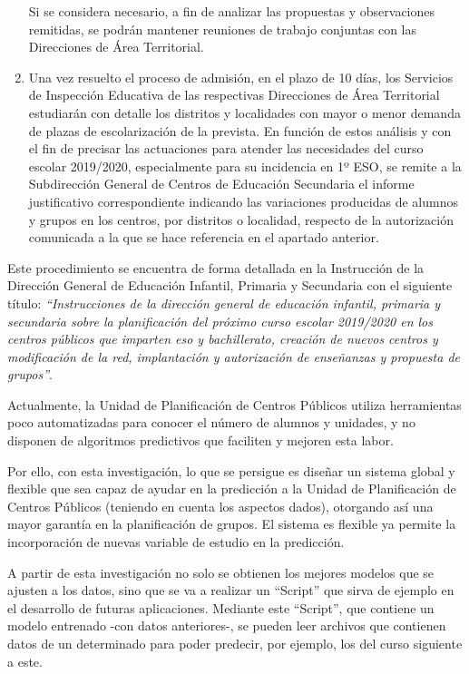 \begin{enumerate}
	Si se considera necesario, a fin de analizar las propuestas y observaciones remitidas, se podrán mantener reuniones de trabajo conjuntas con las Direcciones de Área Territorial.
	
	\item Una vez resuelto el proceso de admisión, en el plazo de 10 días, los Servicios de Inspección Educativa de las respectivas Direcciones de Área Territorial estudiarán con detalle los distritos y localidades con mayor o menor demanda de plazas de escolarización de la prevista. En función de estos análisis y con el fin de precisar las actuaciones para atender las necesidades del curso escolar 2019/2020, especialmente para su incidencia en 1º ESO, se remite a la Subdirección General de Centros de Educación Secundaria el informe justificativo correspondiente indicando las variaciones producidas de alumnos y grupos en los centros, por distritos o localidad, respecto de la autorización comunicada a la que se hace referencia en el apartado anterior. 
\end{enumerate}

Este procedimiento se encuentra de forma detallada en la Instrucción de la Dirección General de Educación Infantil, Primaria y Secundaria con el siguiente título: \textit{``Instrucciones de la dirección general de educación infantil, primaria y secundaria sobre la planificación del próximo curso escolar 2019/2020 en los centros públicos que imparten eso y bachillerato, creación de nuevos centros y modificación de la red, implantación y autorización de enseñanzas y propuesta de grupos''}. \cite{INSTRCONSE}

Actualmente, la Unidad de Planificación de Centros Públicos utiliza herramientas poco automatizadas  para conocer el número de alumnos y unidades, y no disponen de algoritmos predictivos que faciliten y mejoren esta labor.

Por ello, con esta investigación, lo que se persigue  es diseñar un sistema global y flexible que sea capaz de ayudar en la predicción a la Unidad de Planificación de Centros Públicos (teniendo  en cuenta los aspectos dados), otorgando así una mayor garantía en la planificación de grupos. El sistema es flexible ya permite la incorporación de nuevas variable de estudio en la predicción.

A partir de esta investigación no solo se obtienen los mejores modelos que se ajusten a los datos, sino que se va a realizar un ``Script'' que sirva de ejemplo en el desarrollo de futuras aplicaciones. Mediante este ``Script'', que contiene un modelo entrenado -con datos anteriores-, se pueden leer archivos que contienen datos de un determinado para poder predecir, por ejemplo, los del curso siguiente a este.



